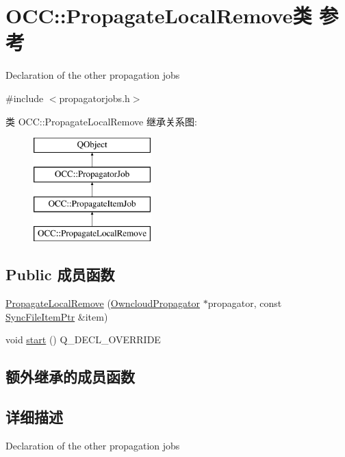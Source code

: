 \hypertarget{class_o_c_c_1_1_propagate_local_remove}{}\section{O\+CC\+:\+:Propagate\+Local\+Remove类 参考}
\label{class_o_c_c_1_1_propagate_local_remove}


Declaration of the other propagation jobs  




{\ttfamily \#include $<$propagatorjobs.\+h$>$}

类 O\+CC\+:\+:Propagate\+Local\+Remove 继承关系图\+:\begin{figure}[H]
\begin{center}
\leavevmode
\includegraphics[height=4.000000cm]{class_o_c_c_1_1_propagate_local_remove}
\end{center}
\end{figure}
\subsection*{Public 成员函数}
\begin{DoxyCompactItemize}
\item 
\hyperlink{class_o_c_c_1_1_propagate_local_remove_ab7e23118741947f6f1ddfdee1b4ed336}{Propagate\+Local\+Remove} (\hyperlink{class_o_c_c_1_1_owncloud_propagator}{Owncloud\+Propagator} $\ast$propagator, const \hyperlink{namespace_o_c_c_acb6b0db82893659fbd0c98d3c5b8e2b8}{Sync\+File\+Item\+Ptr} \&item)
\item 
void \hyperlink{class_o_c_c_1_1_propagate_local_remove_af810729c9c8ca5d51d1ad019d27f6909}{start} () Q\+\_\+\+D\+E\+C\+L\+\_\+\+O\+V\+E\+R\+R\+I\+DE
\end{DoxyCompactItemize}
\subsection*{额外继承的成员函数}


\subsection{详细描述}
Declaration of the other propagation jobs 


